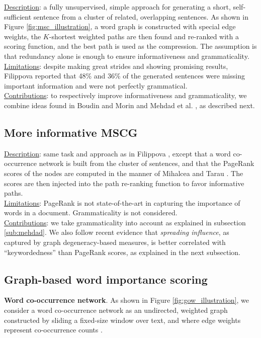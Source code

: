 \documentclass[11pt,a4paper]{article}
\begin{document}
\underline{Description}: a fully unsupervised, simple approach for generating a short, self-sufficient sentence from a cluster of related, overlapping sentences. As shown in Figure \ref{fig:msc_illustration}, a word graph is constructed with special edge weights, the $K$-shortest weighted paths are then found and re-ranked with a scoring function, and the best path is used as the compression. The assumption is that redundancy alone is enough to ensure informativeness and grammaticality.\\
\underline{Limitations}: despite making great strides and showing promising results, Filippova  reported that 48\% and 36\% of the generated sentences were missing important information and were not perfectly grammatical.\\
\underline{Contributions}: to respectively improve informativeness and grammaticality, we combine ideas found in Boudin and Morin  and Mehdad et al. , as described next.

\subsection{More informative MSCG \cite{boudin2013keyphrase}}
\underline{Description}: same task and approach as in Filippova , except that a word co-occurrence network is built from the cluster of sentences, and that the PageRank scores of the nodes are computed in the manner of Mihalcea and Tarau . The scores are then injected into the path re-ranking function to favor informative paths.\\
\underline{Limitations}: PageRank is not state-of-the-art in capturing the importance of words in a document. Grammaticality is not considered. \\
\underline{Contributions}: we take grammaticality into account as explained in subsection \ref{sub:mehdad}. We also follow recent evidence \cite{tixier2016graph} that \textit{spreading influence}, as captured by graph degeneracy-based measures, is better correlated with ``keywordedness'' than PageRank scores, as explained in the next subsection.

\subsection{Graph-based word importance scoring \cite{tixier2016graph}}\label{app:a}
\noindent \textbf{Word co-occurrence network}. As shown in Figure \ref{fig:gow_illustration}, we consider a word co-occurrence network as an undirected, weighted graph constructed by sliding a fixed-size window over text, and where edge weights represent co-occurrence counts \cite{tixier2016gowvis,mihalcea2004textrank}.
\end{document}
